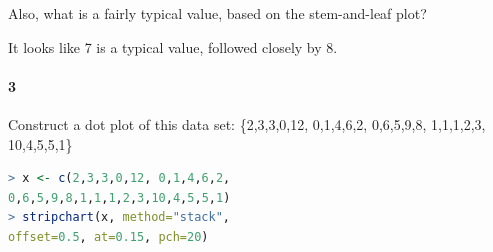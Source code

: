     Also, what is a fairly typical value, based on the stem-and-leaf plot?

    \begin{mdframed}
        It looks like 7 is a typical value, followed closely by 8.
    \end{mdframed}

    \paragraph*{3}
    Construct a dot plot of this data set: \{2,3,3,0,12, 0,1,4,6,2, 0,6,5,9,8, 1,1,1,2,3, 10,4,5,5,1\}

    \begin{mdframed}
        \begin{multicols*}{2}
        \begin{lstlisting}[language=R]
> x <- c(2,3,3,0,12, 0,1,4,6,2, 
0,6,5,9,8,1,1,1,2,3,10,4,5,5,1)
> stripchart(x, method="stack", 
offset=0.5, at=0.15, pch=20)
        \end{lstlisting}

    \end{multicols*}
    \end{mdframed}


